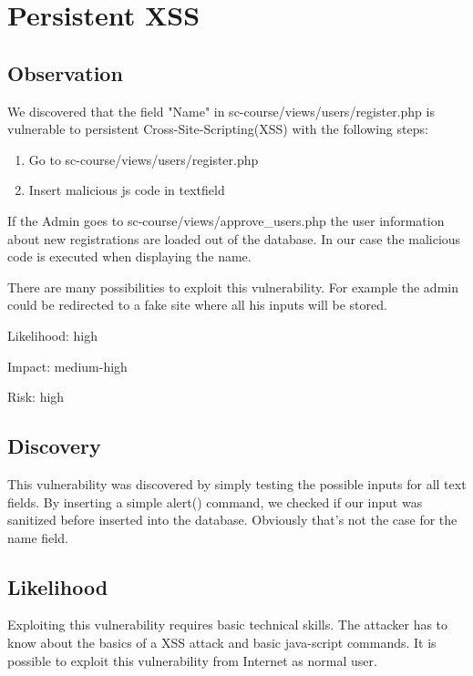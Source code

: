 \chapter{Persistent XSS}

\section{Observation}

We discovered that the field "Name" in sc-course/views/users/register.php is vulnerable to persistent Cross-Site-Scripting(XSS) with the following steps:
\begin{enumerate}
 \item Go to sc-course/views/users/register.php
 \item Insert malicious js code in textfield
\end{enumerate}
 If the Admin goes to sc-course/views/approve\_users.php the user information about new registrations are  loaded out of the database. In our case the malicious code is executed when displaying the name.

There are many possibilities to exploit this vulnerability. For example the admin could be redirected to a fake site where all his inputs will be stored.\newline


Likelihood: high \newline

Impact: medium-high\newline

Risk: high\newline

\section{Discovery}

This vulnerability was discovered by simply testing the possible inputs for all text fields. By inserting a simple alert() command, we checked if our input was sanitized before inserted into the database. Obviously that's not the case for the name field.

\section{Likelihood}
Exploiting this vulnerability requires basic technical skills. The attacker has to know about the basics of a XSS attack and basic java-script commands. It is possible to exploit this vulnerability from Internet as normal user.

